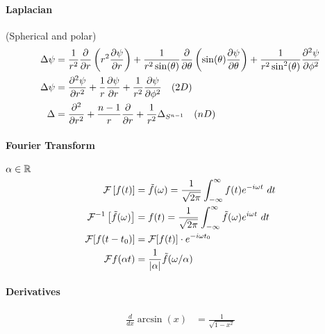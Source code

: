 \paragraph{Laplacian} (Spherical and polar)
\begin{align*}
    \Delta \psi &= \frac{1}{r^2} \frac{\partial}{\partial r} \left( r^2  \frac{\partial \psi}{\partial r} \right) +
        \frac{1}{r^2 \sin(\theta)} \frac{\partial}{\partial \theta} \left( \sin(\theta) \frac{\partial \psi}{\partial \theta} \right)
        + \frac{1}{r^2 \sin^2(\theta)} \frac{\partial^2 \psi}{\partial \phi^2}
    \\
    \Delta \psi &= \frac{\partial^2 \psi}{\partial r^2} + \frac{1}{r} \frac{\partial \psi}{\partial r} + \frac{1}{r^2} \frac{\partial \psi}{\partial \phi^2}
    \hspace{10pt} (2 D)
    \\
    \Delta &= \frac{\partial^2}{\partial r^2} + \frac{n-1}{r} \frac{\partial}{\partial r} + \frac{1}{r^2} \Delta_{S^{n-1}}
    \hspace{10pt} (n D)
\end{align*}

\paragraph{Fourier Transform} $\alpha \in \mathbb{R}$
\begin{align*}
    \mathcal{F} \left[ f(t) \right] &= \tilde{f}(\omega) = \frac{1}{\sqrt{2 \pi}} \int_{-\infty}^\infty f(t) e^{-i \omega t} \ dt
    \\
    \mathcal{F}^{-1} \left[ \tilde{f}(\omega) \right] &= f(t) = \frac{1}{\sqrt{2 \pi}} \int_{-\infty}^\infty \tilde{f}(\omega) e^{i \omega t} \ dt
    \\
    \mathcal{F}[f(t-t_0)] &= \mathcal{F}[f(t)] \cdot e^{-i \omega t_0}
    \\
    \mathcal{F}{f(\alpha t)} &= \frac{1}{\left\vert \alpha \right\vert} \tilde{f}(\omega/\alpha)
\end{align*}

\paragraph{Derivatives}
\begin{align*}
    \frac{d}{dx} \arcsin(x) &= \frac{1}{\sqrt{1-x^2}}
\end{align*}


